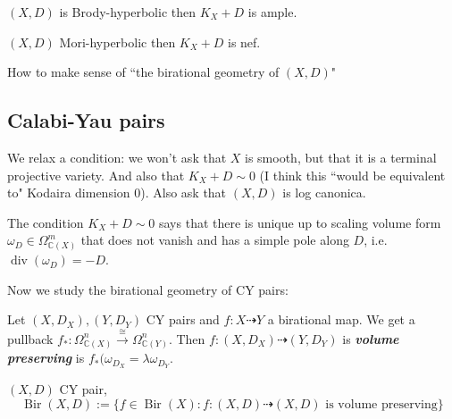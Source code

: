 \begin{conjecture}
\((X,D)\) is Brody-hyperbolic then \(K_X + D\) is ample.
\end{conjecture}

\begin{thm}[Sraldi, 2019]\leavevmode
\((X,D)\) Mori-hyperbolic then \(K_X+D\) is nef.
\end{thm}

\begin{question}\leavevmode
How to make sense of ``the birational geometry of \((X,D)\)"
\end{question}

\subsection{Calabi-Yau pairs}

\begin{defn}\leavevmode
We relax a condition: we won't ask that \(X\) is smooth, but that it is a terminal projective variety. And also that \(K_X+D \sim 0\) (I think this ``would be equivalent to" Kodaira dimension 0). Also ask that \((X,D)\) is log canonica.
\end{defn}

\begin{remark}\leavevmode
The condition \(K_X+D \sim 0\) says that there is unique up to scaling volume form \(\omega_D \in \Omega^m_{\mathbb{C}(X)}\) that does not vanish and has a simple pole along \(D\), i.e.  \(\operatorname{div}(\omega_D)=-D\).
\end{remark}

Now we study the birational geometry of CY pairs:

\begin{defn}\leavevmode
Let \((X,D_X),(Y,D_Y)\) CY pairs and \(f: X \dashrightarrow Y\) a birational map. We get a pullback \(f_*:\Omega^n_{\mathbb{C}(X)}\overset{\cong}{\to} \Omega^n_{\mathbb{C}(Y)}\). Then \(f:(X,D_X) \dashrightarrow (Y,D_Y)\) is \textit{\textbf{volume preserving}} is \(f_*(\omega_{D_X}=\lambda \omega_{D_Y}\).
\end{defn}

\begin{remark}\leavevmode

\end{remark}

\begin{defn}\leavevmode
\((X,D)\) CY pair,
\[\operatorname{Bir}(X,D):=\{f \in \operatorname{Bir}(X) : f:(X,D) \dashrightarrow (X,D) \text{ is volume preserving} \}\]
\end{defn}

